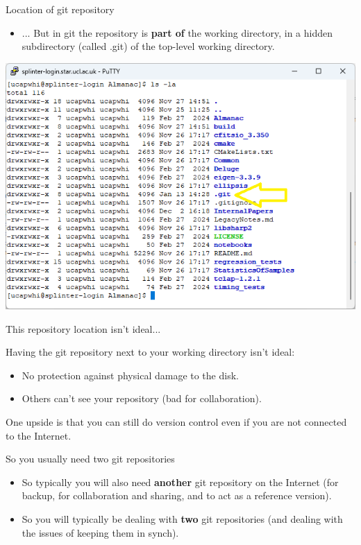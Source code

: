 \documentclass[usenames,dvipsnames]{beamer}
\begin{document}
\begin{frame}{Location of git repository}
  \begin{block}{}
    \begin{itemize}
      \item{... But in git the repository is \textbf{part of} the working directory, in a hidden subdirectory (called .git) of the top-level working directory.}
    \end{itemize}
    \begin{center}
      \includegraphics[scale=0.45]{ls_output.png}
    \end{center}
  \end{block}
\end{frame}


\begin{frame}{This repository location isn't ideal...}
  \begin{block}{}
    Having the git repository next to your working directory isn't ideal:
    \begin{itemize}
      \item{No protection against physical damage to the disk.}
      \item{Others can't see your repository (bad for collaboration).}
    \end{itemize}
    \vspace{1cm}
    One upside is that you can still do version control even if you are not connected to the Internet.
  \end{block}
\end{frame}


\begin{frame}{So you usually need two git repositories}
  \begin{block}{}
    \begin{itemize}
      \item{So typically you will also need \textbf{another} git repository on the Internet (for backup, for collaboration and sharing, and to act as a reference version).}
      \item{So you will typically be dealing with \textbf{two} git repositories (and dealing with the issues of keeping them in synch).}
    \end{itemize}
  \end{block}
\end{frame}
\end{document}
